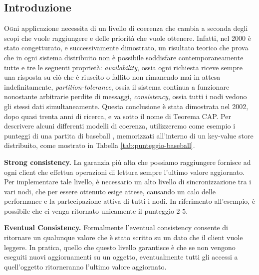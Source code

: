 \documentclass[twoside]{article}
\begin{document}
\begin{multicols}{2} %

\section{Introduzione}
\label{sec:introduzione}
\lettrine[nindent=0em,lines=2]{O} gni applicazione necessita di un livello di coerenza che cambia a seconda degli scopi che vuole raggiungere e delle priorità che vuole ottenere. Infatti, nel 2000 è stato congetturato, e successivamente dimostrato, un risultato teorico che prova che in ogni sistema distribuito non è possibile soddisfare contemporaneamente tutte e tre le seguenti proprietà: \emph{availability}, ossia ogni richiesta riceve sempre una risposta su ciò che è riuscito o fallito non rimanendo mai in attesa indefinitamente, \emph{partition-tolerance}, ossia il sistema continua a funzionare nonostante arbitrarie perdite di messaggi, \emph{consistency}, ossia tutti i nodi vedono gli stessi dati simultaneamente. Questa conclusione è stata dimostrata nel 2002, dopo quasi trenta anni di ricerca, e va sotto il nome di Teorema CAP.
Per descrivere alcuni differenti modelli di coerenza, utilizzeremo come esempio i punteggi di una partita di baseball \cite{bib:baseball}, memorizzati all'interno di un key-value store distribuito, come mostrato in Tabella \ref{tab:punteggio-baseball}.

\textbf{Strong consistency.} La garanzia più alta che possiamo raggiungere fornisce ad ogni client che effettua operazioni di lettura sempre l'ultimo valore aggiornato. Per implementare tale livello, è necessario un alto livello di sincronizzazione tra i vari nodi, che per essere ottenuto esige attese, causando un calo delle performance e la partecipazione attiva di tutti i nodi. In riferimento all'esempio, è possibile che ci venga ritornato unicamente il punteggio $2$-$5$.

\textbf{Eventual Consistency.} Formalmente l'eventual consistency consente di ritornare un qualunque valore che è stato scritto su un dato che il client vuole leggere. In pratica, quello che questo livello garantisce è che se non vengono eseguiti nuovi aggiornamenti su un oggetto, eventualmente tutti gli accessi a quell'oggetto ritorneranno l'ultimo valore aggiornato.
\begin{table}[H]
\centering
{}
\caption{Esempio di punteggio nel baseball.}
\label{tab:punteggio-baseball}
\end{table}


\end{multicols}
\end{document}
